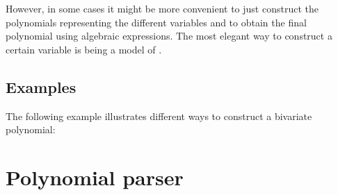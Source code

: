 However, in some cases it might be more convenient to just construct 
the polynomials representing the different variables and to obtain the 
final polynomial using 
algebraic expressions. The most elegant way to construct a certain variable is 
 being a model of 
. 

\subsection{Examples}

The following example illustrates different ways to construct a 
bivariate polynomial:


\section{Polynomial parser}

